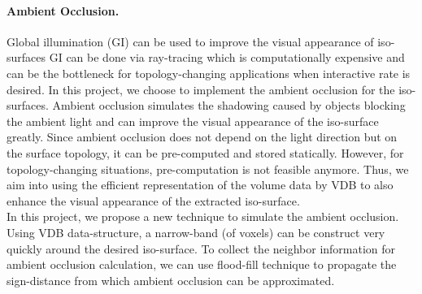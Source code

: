 \documentclass[12pt] {article}
\begin{document}
\paragraph{Ambient Occlusion.} Global illumination (GI) can be used to improve the visual appearance of iso-surfaces %
GI can be done via ray-tracing which is computationally expensive and can be the bottleneck for topology-changing applications when interactive rate is desired. In this project, we choose to implement the ambient occlusion for the iso-surfaces. Ambient occlusion simulates the shadowing caused by objects blocking the ambient light and can improve the visual appearance of the iso-surface greatly. Since ambient occlusion does not depend on the light direction but on the surface topology, it can be pre-computed and stored statically. However, for topology-changing situations, pre-computation is not feasible anymore. Thus, we aim into using the efficient representation of the volume data by VDB to also enhance the visual appearance of the extracted iso-surface. 
\\



\noindent In this project, we propose a new technique to simulate the ambient occlusion. Using VDB data-structure, a narrow-band (of voxels) can be construct very quickly around the desired iso-surface. To collect the neighbor information for ambient occlusion calculation, we can use flood-fill technique to propagate the sign-distance from which ambient occlusion can be approximated. 



\end{document}
